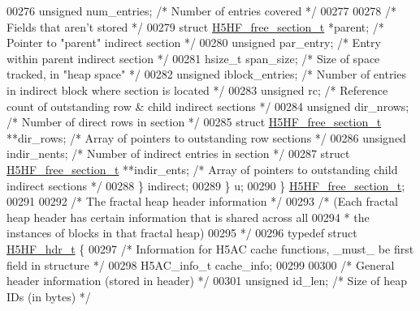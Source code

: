 \begin{DoxyCode}
00276             \textcolor{keywordtype}{unsigned}    num\_entries;            \textcolor{comment}{/* Number of entries covered */}
00277 
00278             \textcolor{comment}{/* Fields that aren't stored */}
00279             \textcolor{keyword}{struct }\hyperlink{struct_h5_h_f__free__section__t}{H5HF\_free\_section\_t} *parent; \textcolor{comment}{/* Pointer to "parent" indirect section 
      */}
00280             \textcolor{keywordtype}{unsigned}    par\_entry;              \textcolor{comment}{/* Entry within parent indirect section */}
00281             hsize\_t     span\_size;              \textcolor{comment}{/* Size of space tracked, in "heap space" */}
00282             \textcolor{keywordtype}{unsigned}    iblock\_entries;         \textcolor{comment}{/* Number of entries in indirect block where section is
       located */}
00283             \textcolor{keywordtype}{unsigned}    rc;                     \textcolor{comment}{/* Reference count of outstanding row & child indirect
       sections */}
00284             \textcolor{keywordtype}{unsigned}    dir\_nrows;              \textcolor{comment}{/* Number of direct rows in section */}
00285             \textcolor{keyword}{struct }\hyperlink{struct_h5_h_f__free__section__t}{H5HF\_free\_section\_t} **dir\_rows;  \textcolor{comment}{/* Array of pointers to outstanding
       row sections */}
00286             \textcolor{keywordtype}{unsigned}    indir\_nents;            \textcolor{comment}{/* Number of indirect entries in section */}
00287             \textcolor{keyword}{struct }\hyperlink{struct_h5_h_f__free__section__t}{H5HF\_free\_section\_t} **indir\_ents; \textcolor{comment}{/* Array of pointers to outstanding
       child indirect sections */}
00288         \} indirect;
00289     \} u;
00290 \} \hyperlink{struct_h5_h_f__free__section__t}{H5HF\_free\_section\_t};
00291 
00292 \textcolor{comment}{/* The fractal heap header information */}
00293 \textcolor{comment}{/* (Each fractal heap header has certain information that is shared across all}
00294 \textcolor{comment}{ * the instances of blocks in that fractal heap)}
00295 \textcolor{comment}{ */}
00296 \textcolor{keyword}{typedef} \textcolor{keyword}{struct }\hyperlink{struct_h5_h_f__hdr__t}{H5HF\_hdr\_t} \{
00297     \textcolor{comment}{/* Information for H5AC cache functions, \_must\_ be first field in structure */}
00298     H5AC\_info\_t cache\_info;
00299 
00300     \textcolor{comment}{/* General header information (stored in header) */}
00301     \textcolor{keywordtype}{unsigned}    id\_len;         \textcolor{comment}{/* Size of heap IDs (in bytes) */}

\end{DoxyCode}

